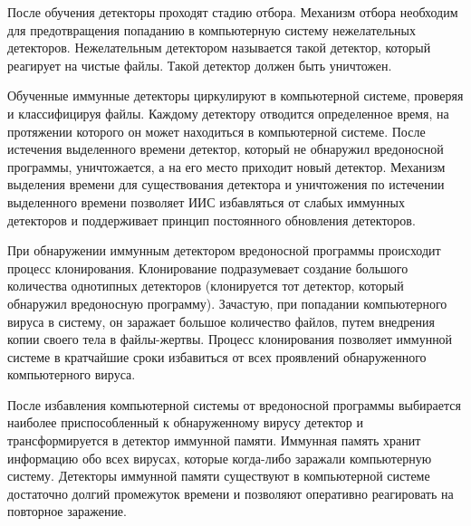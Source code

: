 \documentclass[bachelor, och, referat]{template}
\begin{document}
После обучения детекторы проходят стадию отбора. Механизм отбора
необходим для предотвращения попаданию в компьютерную систему 
не­желательных детекторов. Нежелательным детектором называется такой
детектор, который реагирует на чистые файлы. Такой детектор должен
быть уничтожен.

Обученные иммунные детекторы циркулируют в компьютерной сис­теме, 
проверяя и классифицируя файлы. Каждому детектору отводится
определенное время, на протяжении которого он может находиться в
компьютерной системе. После истечения выделенного времени детектор,
который не обнаружил вредоносной программы, уничтожается, а на его
место приходит новый детектор. Механизм выделения времени для 
существования детектора и уничтожения по истечении выделенного времени
позволяет ИИС избавляться от слабых иммунных детекторов и поддержи­вает 
принцип постоянного обновления детекторов.

При обнаружении иммунным детектором вредоносной программы
происходит процесс клонирования. Клонирование подразумевает созда­ние 
большого количества однотипных детекторов (клонируется тот детек­тор, 
который обнаружил вредоносную программу). Зачастую, при попа­дании 
компьютерного вируса в систему, он заражает большое количество
файлов, путем внедрения копии своего тела в файлы-жертвы. Процесс
клонирования позволяет иммунной системе в кратчайшие сроки изба­виться 
от всех проявлений обнаруженного компьютерного вируса.

После избавления компьютерной системы от вредоносной программы
выбирается наиболее приспособленный к обнаруженному вирусу детек­тор 
и трансформируется в детектор иммунной памяти. Иммунная память
хранит информацию обо всех вирусах, которые когда-либо заражали 
ком­пьютерную систему. Детекторы иммунной памяти существуют в 
компью­терной системе достаточно долгий промежуток времени и позволяют 
опе­ративно реагировать на повторное заражение.



\end{document}
